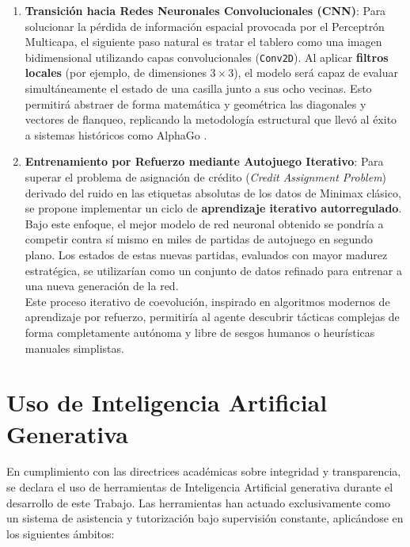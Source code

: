 \documentclass[conference]{IEEEtran}
\begin{document}
\begin{enumerate}
    \item \textbf{Transición hacia Redes Neuronales Convolucionales (CNN)}: Para solucionar la pérdida de información espacial provocada por el Perceptrón Multicapa, el 
    siguiente paso natural es tratar el tablero como una imagen bidimensional utilizando capas convolucionales (\texttt{Conv2D}). Al aplicar \textbf{filtros locales} (por ejemplo, 
    de dimensiones $3 \times 3$), el modelo será capaz de evaluar simultáneamente el estado de una casilla junto a sus ocho vecinas. Esto permitirá abstraer de forma matemática y 
    geométrica las diagonales y vectores de flanqueo, replicando la metodología estructural que llevó al éxito a sistemas históricos como AlphaGo \cite{goodfellow}.\\
    
    \item \textbf{Entrenamiento por Refuerzo mediante Autojuego Iterativo}: Para superar el problema de asignación de crédito (\textit{Credit Assignment Problem}) derivado 
    del ruido en las etiquetas absolutas de los datos de Minimax clásico, se propone implementar un ciclo de \textbf{aprendizaje iterativo autorregulado}.\\ 
    
    Bajo este enfoque, el mejor 
    modelo de red neuronal obtenido se pondría a competir contra sí mismo en miles de partidas de autojuego en segundo plano. Los estados de estas nuevas partidas, evaluados 
    con mayor madurez estratégica, se utilizarían como un conjunto de datos refinado para entrenar a una nueva generación de la red.\\ 
    
    Este proceso iterativo de coevolución, inspirado 
    en algoritmos modernos de aprendizaje por refuerzo, permitiría al agente descubrir tácticas complejas de forma completamente autónoma y libre de sesgos humanos o heurísticas manuales simplistas.
\end{enumerate}


\section{Uso de Inteligencia Artificial Generativa}
En cumplimiento con las directrices académicas sobre integridad y transparencia, se declara el uso de herramientas de Inteligencia Artificial 
generativa durante el desarrollo de este Trabajo. Las herramientas han actuado exclusivamente como 
un sistema de asistencia y tutorización bajo supervisión constante, aplicándose en los siguientes ámbitos:
\end{document}
